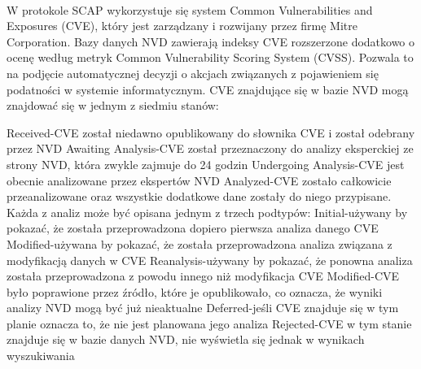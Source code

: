 \documentclass[a4paper,12pt,twoside]{article}
\newcommand\tab[1][1cm]{\hspace*{#1}}
\begin{document}
\paragraph{}
W protokole SCAP wykorzystuje się system Common Vulnerabilities and Exposures (CVE), który jest zarządzany i rozwijany przez firmę Mitre Corporation. Bazy danych NVD zawierają indeksy CVE rozszerzone dodatkowo o ocenę według metryk Common Vulnerability Scoring System (CVSS). Pozwala to na podjęcie automatycznej decyzji o akcjach związanych z pojawieniem się podatności w systemie informatycznym. CVE znajdujące się w bazie NVD mogą znajdować się w jednym z siedmiu stanów:

Received\tab -\tab CVE został niedawno opublikowany do słownika CVE i został odebrany przez NVD\newline{}
Awaiting Analysis\tab -\tab CVE został przeznaczony do analizy eksperckiej ze strony NVD, która zwykle zajmuje do 24 godzin\newline{}
Undergoing Analysis\tab -\tab CVE jest obecnie analizowane przez ekspertów NVD
Analyzed\tab -\tab CVE zostało całkowicie przeanalizowane oraz wszystkie dodatkowe dane zostały do niego przypisane. Każda z analiz może być opisana jednym z trzech podtypów:\newline{}
    \tab Initial\tab -\tab używany by pokazać, że została przeprowadzona dopiero pierwsza analiza danego CVE\newline{}
    \tab Modified\tab -\tab używana by pokazać, że została przeprowadzona analiza związana z modyfikacją danych w CVE\newline{}
    \tab Reanalysis\tab -\tab używany by pokazać, że ponowna analiza została przeprowadzona z powodu innego niż modyfikacja CVE\newline{}
Modified\tab -\tab CVE było poprawione przez źródło, które je opublikowało, co oznacza, że wyniki analizy NVD mogą być już nieaktualne\newline{}
Deferred\tab -\tab jeśli CVE znajduje się w tym planie oznacza to, że nie jest planowana jego analiza\newline{}
Rejected\tab -\tab CVE w tym stanie znajduje się w bazie danych NVD, nie wyświetla się jednak w wynikach wyszukiwania\newline{}

\paragraph{}
\end{document}
